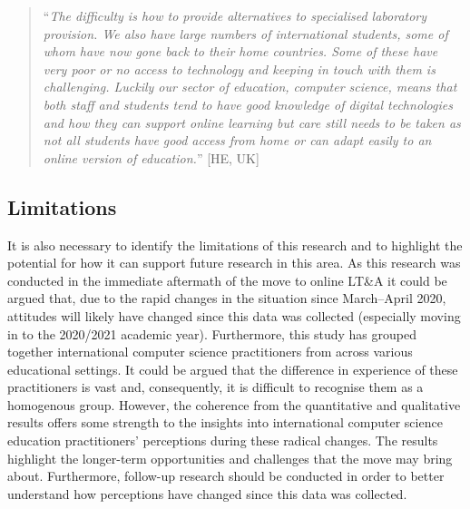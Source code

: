 \documentclass[conference]{IEEEtran}
\begin{document}

\begin{quotation}
``{\emph{The difficulty is how to provide alternatives to specialised
laboratory provision. We also have large numbers of international
students, some of whom have now gone back to their home
countries. Some of these have very poor or no access to technology and
keeping in touch with them is challenging. Luckily our sector of
education, computer science, means that both staff and students tend
to have good knowledge of digital technologies and how they can
support online learning but care still needs to be taken as not all
students have good access from home or can adapt easily to an online
version of education.}}'' [HE, UK]
\end{quotation}

\subsection{Limitations}

It is also necessary to identify the limitations of this research and
to highlight the potential for how it can support future research in
this area. As this research was conducted in the immediate aftermath
of the move to online LT\&A it could be argued that, due to the rapid
changes in the situation since March--April 2020, attitudes will
likely have changed since this data was collected (especially moving
in to the 2020/2021 academic year). Furthermore, this study has
grouped together international computer science practitioners from
across various educational settings. It could be argued that the
difference in experience of these practitioners is vast and,
consequently, it is difficult to recognise them as a homogenous
group. However, the coherence from the quantitative and qualitative
results offers some strength to the insights into international
computer science education practitioners' perceptions during these
radical changes. The results highlight the longer-term opportunities
and challenges that the move may bring about. Furthermore, follow-up
research should be conducted in order to better understand how
perceptions have changed since this data was collected.
\end{document}
